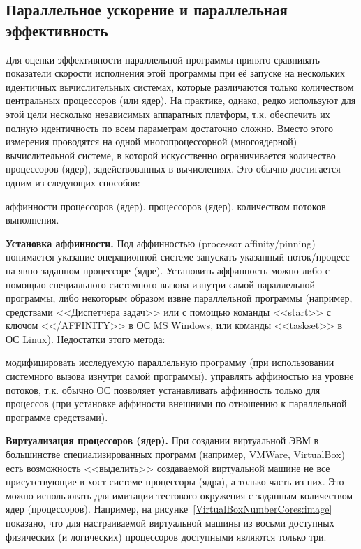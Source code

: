 \subsection{Параллельное ускорение и параллельная эффективность}
\label{subsec:parallel-acceleration-parallel-efficiency}

Для оценки эффективности параллельной программы принято сравнивать показатели скорости исполнения этой программы при её запуске на нескольких идентичных вычислительных системах, которые различаются только количеством центральных процессоров (или ядер). На практике, однако, редко используют для этой цели несколько независимых аппаратных платформ, т.к. обеспечить их полную идентичность по всем параметрам достаточно сложно. Вместо этого измерения проводятся на одной многопроцессорной (многоядерной) вычислительной системе, в которой искусственно ограничивается количество процессоров (ядер), задействованных в вычислениях. Это обычно достигается одним из следующих способов:

\begin{itemize}
     аффинности процессоров (ядер).
     процессоров (ядер).
     количеством потоков выполнения.
\end{itemize}

\textbf{Установка аффинности.} Под аффинностью (processor affin\-i\-ty/pin\-ning) понимается указание операционной системе запускать указанный поток/процесс на явно заданном процессоре (ядре). Установить аффинность можно либо с помощью специального системного вызова изнутри самой параллельной программы, либо некоторым образом извне параллельной программы (например, средствами <<Диспетчера задач>> или с помощью команды <<start>> с ключом <</AFFINITY>> в ОС MS Windows, или команды <<taskset>> в ОС Linux). Недостатки этого метода:

\begin{itemize}
     модифицировать исследуемую параллельную программу (при использовании системного вызова изнутри самой программы).
     управлять аффиностью на уровне потоков, т.к. обычно ОС позволяет устанавливать аффинность только для процессов (при установке аффиности внешними по отношению к параллельной программе средствами).
\end{itemize}

\textbf{Виртуализация процессоров (ядер).} При создании виртуальной ЭВМ в большинстве специализированных программ (например, VMWare, Virtual\-Box) есть возможность <<выделить>> создаваемой виртуальной машине не все присутствующие в хост-системе процессоры (ядра), а только часть из них. Это можно использовать для имитации тестового окружения с заданным количеством ядер (процессоров). Например, на рисунке~\ref{VirtualBoxNumberCores:image} показано, что для настраиваемой виртуальной машины из восьми доступных физических (и логических) процессоров доступными являются только три.

